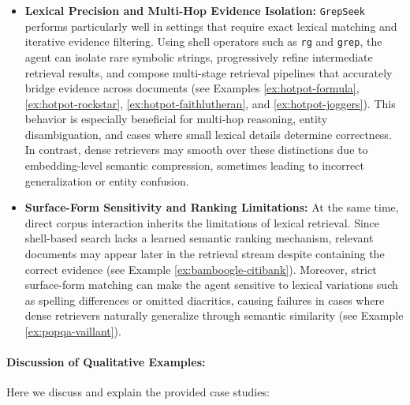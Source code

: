 \documentclass{article} %
\newcommand{\ourmethod}{\texttt{GrepSeek}\xspace}
\begin{document}
\begin{itemize}[leftmargin=1.2em]
    \item \textbf{Lexical Precision and Multi-Hop Evidence Isolation:} \ourmethod{} performs particularly well in settings that require exact lexical matching and iterative evidence filtering. Using shell operators such as \texttt{rg} and \texttt{grep}, the agent can isolate rare symbolic strings, progressively refine intermediate retrieval results, and compose multi-stage retrieval pipelines that accurately bridge evidence across documents (see Examples \ref{ex:hotpot-formula}, \ref{ex:hotpot-rockstar}, \ref{ex:hotpot-faithlutheran}, and \ref{ex:hotpot-joggers}). This behavior is especially beneficial for multi-hop reasoning, entity disambiguation, and cases where small lexical details determine correctness. In contrast, dense retrievers may smooth over these distinctions due to embedding-level semantic compression, sometimes leading to incorrect generalization or entity confusion.
    
    \item \textbf{Surface-Form Sensitivity and Ranking Limitations:} At the same time, direct corpus interaction inherits the limitations of lexical retrieval. Since shell-based search lacks a learned semantic ranking mechanism, relevant documents may appear later in the retrieval stream despite containing the correct evidence (see Example \ref{ex:bamboogle-citibank}). Moreover, strict surface-form matching can make the agent sensitive to lexical variations such as spelling differences or omitted diacritics, causing failures in cases where dense retrievers naturally generalize through semantic similarity (see Example \ref{ex:popqa-vaillant}).
\end{itemize}

\paragraph{Discussion of Qualitative Examples:} Here we discuss and explain the provided case studies:
\end{document}
